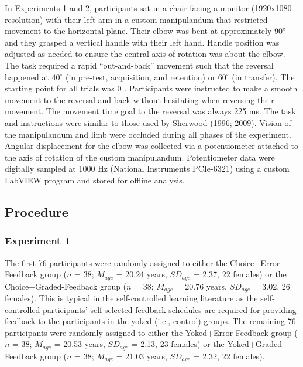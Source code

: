 \documentclass[
  man, donotrepeattitle,floatsintext]{apa7}
\begin{document}
In Experiments 1 and 2, participants sat in a chair facing a monitor (1920x1080 resolution) with their left arm in a custom manipulandum that restricted movement to the horizontal plane. Their elbow was bent at approximately 90° and they grasped a vertical handle with their left hand. Handle position was adjusted as needed to ensure the central axis of rotation was about the elbow. The task required a rapid ``out-and-back'' movement such that the reversal happened at \(40^\circ\) (in pre-test, acquisition, and retention) or \(60^\circ\) (in transfer). The starting point for all trials was \(0^\circ\). Participants were instructed to make a smooth movement to the reversal and back without hesitating when reversing their movement. The movement time goal to the reversal was always 225 ms. The task and instructions were similar to those used by Sherwood (1996; 2009). Vision of the manipulandum and limb were occluded during all phases of the experiment. Angular displacement for the elbow was collected via a potentiometer attached to the axis of rotation of the custom manipulandum. Potentiometer data were digitally sampled at 1000 Hz (National Instruments PCIe-6321) using a custom LabVIEW program and stored for offline analysis.

\hypertarget{procedure}{%
\subsection{Procedure}\label{procedure}}

\hypertarget{experiment-1-1}{%
\subsubsection{Experiment 1}\label{experiment-1-1}}

The first 76 participants were randomly assigned to either the Choice+Error-Feedback group (\(n\) = 38; \(M_{age}\) = 20.24 years, \(SD_{age}\) = 2.37, 22 females) or the Choice+Graded-Feedback group (\(n\) = 38; \(M_{age}\) = 20.76 years, \(SD_{age}\) = 3.02, 26 females). This is typical in the self-controlled learning literature as the self-controlled participants' self-selected feedback schedules are required for providing feedback to the participants in the yoked (i.e., control) groups. The remaining 76 participants were randomly assigned to either the Yoked+Error-Feedback group (\(n\) = 38; \(M_{age}\) = 20.53 years, \(SD_{age}\) = 2.13, 23 females) or the Yoked+Graded-Feedback group (\(n\) = 38; \(M_{age}\) = 21.03 years, \(SD_{age}\) = 2.32, 22 females).
\end{document}

